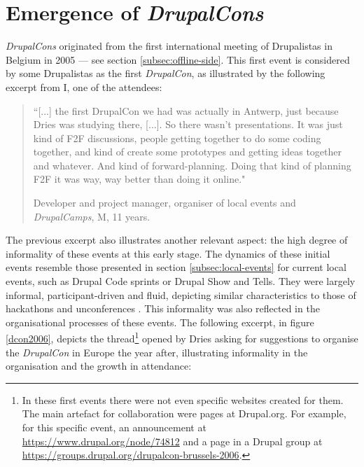 \section{Emergence of \textit{DrupalCons}}
\label{subsec:dcons-emergence}

\textit{DrupalCons} originated from the first international meeting of Drupalistas in Belgium in 2005 --- see section \ref{subsec:offline-side}. This first event is considered by some Drupalistas as the first \textit{DrupalCon}, as illustrated by the following excerpt from I, one of the attendees:

\begin{quotation}
``[...] the first DrupalCon we had was actually in Antwerp, just because Dries was studying there, [...]. So there wasn't presentations. It was just kind of F2F discussions, people getting together to do some coding together, and kind of create some prototypes and getting ideas together and whatever. And kind of forward-planning. Doing that kind of planning F2F it was way, way better than doing it online."

\begin{flushright}\footnotesize{Developer and project manager, organiser of local events and \textit{DrupalCamps}, M, 11 years.}\end{flushright}
\end{quotation}

The previous excerpt also illustrates another relevant aspect: the high degree of informality of these events at this early stage. The dynamics of these initial events resemble those presented in section \ref{subsec:local-events} for current local events, such as Drupal Code sprints or Drupal Show and Tells. They were largely informal, participant-driven and fluid, depicting similar characteristics to those of hackathons and unconferences \parencite[9-10]{greenhill2008unconference}. This informality was also reflected in the organisational processes of these events. The following excerpt, in figure \ref{dcon2006}, depicts the thread\footnote{In these first events there were not even specific websites created for them. The main artefact for collaboration were pages at Drupal.org. For example, for this specific event, an announcement at \url{https://www.drupal.org/node/74812} and a page in a Drupal group at \url{https://groups.drupal.org/drupalcon-brussels-2006}.} opened by Dries asking for suggestions to organise the \textit{DrupalCon} in Europe the year after, illustrating informality in the organisation and the growth in attendance:

